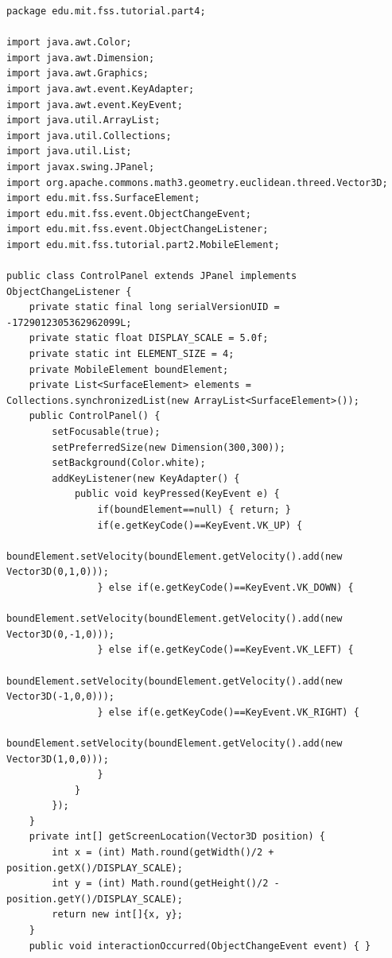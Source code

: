 \documentclass[]{article}
\begin{document}
\begin{Code}
\begin{lstlisting}[caption={ControlPanel object class},label={lst:controlPanel1}]
package edu.mit.fss.tutorial.part4;

import java.awt.Color;
import java.awt.Dimension;
import java.awt.Graphics;
import java.awt.event.KeyAdapter;
import java.awt.event.KeyEvent;
import java.util.ArrayList;
import java.util.Collections;
import java.util.List;
import javax.swing.JPanel;
import org.apache.commons.math3.geometry.euclidean.threed.Vector3D;
import edu.mit.fss.SurfaceElement;
import edu.mit.fss.event.ObjectChangeEvent;
import edu.mit.fss.event.ObjectChangeListener;
import edu.mit.fss.tutorial.part2.MobileElement;

public class ControlPanel extends JPanel implements ObjectChangeListener {
	private static final long serialVersionUID = -1729012305362962099L;
	private static float DISPLAY_SCALE = 5.0f;
	private static int ELEMENT_SIZE = 4;
	private MobileElement boundElement;
	private List<SurfaceElement> elements = Collections.synchronizedList(new ArrayList<SurfaceElement>());
	public ControlPanel() {
		setFocusable(true);
		setPreferredSize(new Dimension(300,300));
		setBackground(Color.white);
		addKeyListener(new KeyAdapter() {
			public void keyPressed(KeyEvent e) {
				if(boundElement==null) { return; }
				if(e.getKeyCode()==KeyEvent.VK_UP) {
					boundElement.setVelocity(boundElement.getVelocity().add(new Vector3D(0,1,0)));
				} else if(e.getKeyCode()==KeyEvent.VK_DOWN) {
					boundElement.setVelocity(boundElement.getVelocity().add(new Vector3D(0,-1,0)));
				} else if(e.getKeyCode()==KeyEvent.VK_LEFT) {
					boundElement.setVelocity(boundElement.getVelocity().add(new Vector3D(-1,0,0)));
				} else if(e.getKeyCode()==KeyEvent.VK_RIGHT) {
					boundElement.setVelocity(boundElement.getVelocity().add(new Vector3D(1,0,0)));
				}
			}
		});
	}
	private int[] getScreenLocation(Vector3D position) {
		int x = (int) Math.round(getWidth()/2 + position.getX()/DISPLAY_SCALE);
		int y = (int) Math.round(getHeight()/2 - position.getY()/DISPLAY_SCALE);
		return new int[]{x, y};
	}
	public void interactionOccurred(ObjectChangeEvent event) { }
\end{lstlisting}
\end{Code}
\end{document}
